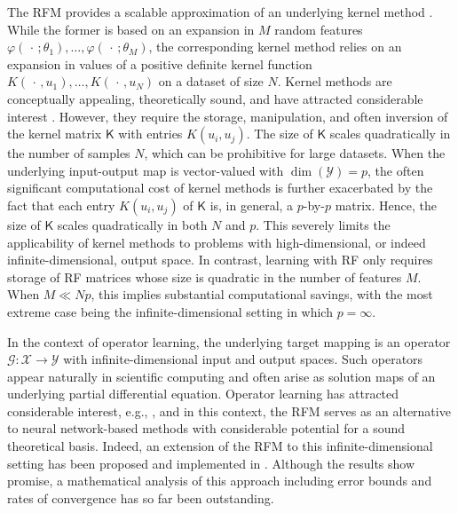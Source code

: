 \documentclass{article}
\theoremstyle{plain}
\theoremstyle{my_def}
\theoremstyle{my_rem}
\numberwithin{equation}{section}
\numberwithin{theorem}{section}%
\newcommand{\cG}{\mathcal{G}}
\newcommand{\cX}{\mathcal{X}}
\newcommand{\cY}{\mathcal{Y}}
\newcommand{\slot}{{\,\cdot\,}}
\renewcommand{\phi}{\varphi}
\begin{document}
The RFM provides a scalable approximation of an underlying kernel method \cite{rahimi2007random,RR2008}. While the former is based on an expansion in $M$ random features $\phi(\slot;\theta_1),\dots, \phi(\slot;\theta_M)$, the corresponding kernel method relies on an expansion in values of a positive definite kernel function $K(\slot,u_1),\dots,K(\slot,u_N)$ on a dataset of size $N$. Kernel methods are conceptually appealing, theoretically sound, and have attracted considerable interest \cite{aronszajn1950theory,caponnetto2007optimal,scholkopf2018learning}. However, they require the storage, manipulation, and often inversion of the kernel matrix $\mathsf{K}$ with entries $K(u_i,u_j)$. The size of $\mathsf{K}$ scales quadratically in the number of samples $N$, which can be prohibitive for large datasets. When the underlying input-output map is vector-valued with $\dim(\cY)=p$, the often significant computational cost of kernel methods is further exacerbated by the fact that each entry $K(u_i,u_j)$ of $\mathsf{K}$ is, in general, a $p$-by-$p$ matrix. Hence, the size of $\mathsf{K}$ scales quadratically in both $N$ and $p$. This severely limits the applicability of kernel methods to problems with high-dimensional, or indeed infinite-dimensional, output space. In contrast, learning with RF only requires storage of RF matrices whose size is quadratic in the number of features $M$. When $M\ll Np$, this implies substantial computational savings, with the most extreme case being the infinite-dimensional setting in which $p=\infty$.

In the context of operator learning, the underlying target mapping is an operator $\cG\colon \cX \to \cY$ with infinite-dimensional input and output spaces. Such operators appear naturally in scientific computing and often arise as solution maps of an underlying partial differential equation. Operator learning has attracted considerable interest, e.g., \cite{pca,gin2020deepgreen,pca2,fourierop2020,lu2021learning}, and in this context, the RFM serves as an alternative to neural network-based methods with considerable potential for a sound theoretical basis. Indeed, an extension of the RFM to this infinite-dimensional setting has been proposed and implemented in \cite{rfm}. Although the results show promise, a mathematical analysis of this approach including error bounds and rates of convergence has so far been outstanding. 
\end{document}
